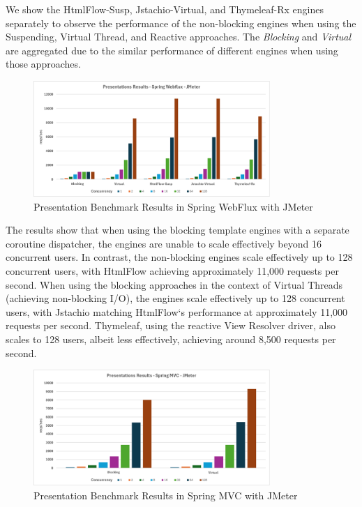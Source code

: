 We show the HtmlFlow-Susp, Jstachio-Virtual, and Thymeleaf-Rx engines
separately to observe the performance of the non-blocking engines when using
the Suspending, Virtual Thread, and Reactive approaches. The \textit{Blocking}
and \textit{Virtual} are aggregated due to the similar performance of different
engines when using those approaches.

\begin{figure}[h]
     \centering
     \includegraphics[width=0.8\textwidth]{./Graphs/presentations-webflux-jmeter.png}
     \caption{Presentation Benchmark Results in Spring WebFlux with JMeter}\label{fig:presentations-webflux-jmeter}
\end{figure}

The results show that when using the blocking template engines with a separate
coroutine dispatcher, the engines are unable to scale effectively beyond 16
concurrent users. In contrast, the non-blocking engines scale effectively up to
128 concurrent users, with HtmlFlow achieving approximately 11,000 requests per
second. When using the blocking approaches in the context of Virtual Threads
(achieving non-blocking I/O), the engines scale effectively up to 128
concurrent users, with Jstachio matching HtmlFlow`s performance at
approximately 11,000 requests per second. Thymeleaf, using the reactive View
Resolver driver, also scales to 128 users, albeit less effectively, achieving
around 8,500 requests per second.

\begin{figure}[h]
     \centering
     \includegraphics[width=0.8\textwidth]{./Graphs/presentations-springmvc-jmeter.png}
     \caption{Presentation Benchmark Results in Spring MVC with JMeter}\label{fig:presentations-springmvc-jmeter}
\end{figure}

